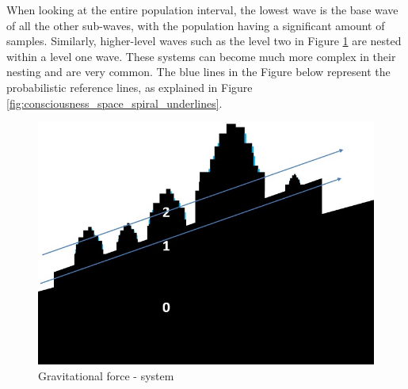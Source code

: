 When looking at the entire population interval, the lowest wave is the base wave of all the other sub-waves, with the population having a significant amount of samples.  Similarly, higher-level waves such as the level two in Figure \ref{fig:consciousness_gravitational_force_system} are nested within a level one wave. These systems can become much more complex in their nesting and are very common. The blue lines in the Figure below represent the probabilistic reference lines, as explained in Figure \ref{fig:consciousness_space_spiral_underlines}.
	\begin{figure}[H]
	\caption{Gravitational force - system}
	\label{fig:consciousness_gravitational_force_system}
	\centering
	\includegraphics[scale=.35]{sections/images/consciousness_gravitational_force_system.jpg}
	\end{figure}
	
